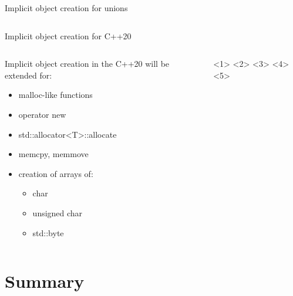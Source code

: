 \documentclass{panicsoftware-presentation}
\makeatletter
\newenvironment{itemizeSeq}{\begin{itemize}[<+-|alert@+>]}{\end{itemize}}
\makeatother
\begin{document}
\begin{frame}{Implicit object creation for unions}

\inputminted[highlightlines={4,13}]{\myCpp}{examples/implicit-obj-creation-unions-nondefault.cpp}

\end{frame}

\begin{frame}{Implicit object creation for C++20}

\begin{columns}

\begin{column}{0.45\linewidth}


Implicit object creation in the C++20 will be extended for:

\begin{itemizeSeq}

\item malloc-like functions
\item operator new
\item std::allocator<T>::allocate
\item memcpy, memmove
\item creation of arrays of:
\begin{itemize}[<5->]
	\item char
	\item unsigned char
	\item std::byte
\end{itemize}

\end{itemizeSeq}

\end{column}

\begin{column}{0.55\linewidth}

<1>
<2>
<3>
<4>
<5>

\end{column}

\end{columns}


\end{frame}

\section*{Summary}
\end{document}
